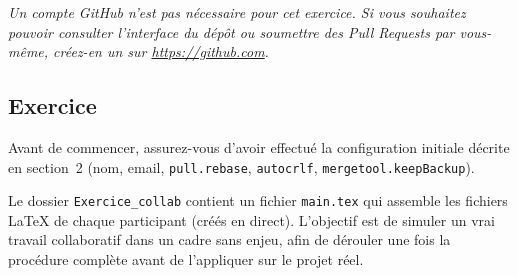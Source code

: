 \documentclass[11pt,a4paper]{article}
\begin{document}
\textit{Un compte GitHub n'est pas nécessaire pour cet exercice. 
	Si vous souhaitez pouvoir consulter l'interface du dépôt ou 
	soumettre des Pull Requests par vous-même, créez-en un sur 
	\url{https://github.com}.}
\subsection{Exercice}
Avant de commencer, assurez-vous d'avoir effectué la configuration 
initiale décrite en section~2 (nom, email, \texttt{pull.rebase}, 
\texttt{autocrlf}, \texttt{mergetool.keepBackup}).

Le dossier \texttt{Exercice\_collab} contient un fichier \texttt{main.tex} 
qui assemble les fichiers \LaTeX{} de chaque participant (créés en direct). 
L'objectif est de simuler un vrai travail collaboratif dans un cadre sans enjeu, 
afin de dérouler une fois la procédure complète avant de l'appliquer sur le projet réel.
	
\end{document}
